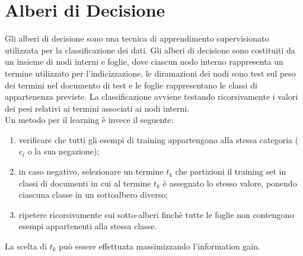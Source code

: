 \documentclass{report}
\begin{document}
	\section{Alberi di Decisione}
	Gli alberi di decisione sono una tecnica di apprendimento supervisionato utilizzata per la classificazione dei dati. Gli alberi di decisione sono costituiti da un insieme di nodi interni e foglie, dove ciascun nodo interno rappresenta un termine utilizzato per l'indicizzazione, le diramazioni dei nodi sono test sul peso dei termini nel documento di test e le foglie rappresentano le classi di appartenenza previste. La classificazione avviene testando ricorsivamente i valori dei pesi relativi ai termini associati ai nodi interni.
	\vspace{\baselineskip}\\
	Un metodo per il learning è invece il seguente:
	\begin{enumerate}
		\item verificare che tutti gli esempi di training appartengono alla stessa categoria ($c_i$ o la sua negazione);
		\item in caso negativo, selezionare un termine $t_k$ che partizioni il training set in classi di documenti in cui al termine $t_k$ è assegnato lo stesso valore, ponendo ciascuna classe in un sottoalbero diverso;
		\item ripetere ricorsivamente sui sotto-alberi finchè tutte le foglie non contengono esempi appartenenti alla stessa classe.
	\end{enumerate}
	La scelta di $t_k$ può essere effettuata massimizzando l'information gain.
\end{document}
